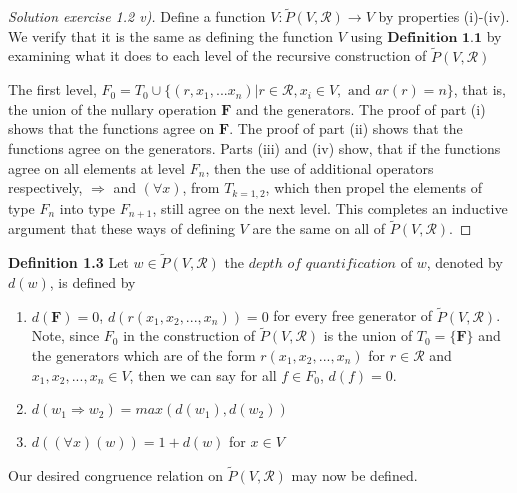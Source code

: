 \documentclass{article}
\theoremstyle{problemstyle}
\begin{document}
\begin{proof}[Solution exercise 1.2 v)] 
Define a function $V:\widetilde{P}(V, \mathscr{R}) \rightarrow V$ by properties (i)-(iv). We verify that it is the same as defining the function $V$ using $\textbf{Definition 1.1}$ by examining what it does to each level of the recursive construction of $\widetilde{P}(V, \mathscr{R})$

The first level, $F_0 = T_0 \cup \{(r,x_1,...x_n)|r \in \mathscr{R}, x_i \in V, \text{ and }ar(r) = n\}$, that is, the union of the nullary operation $\textbf{F}$ and the generators. The proof of part (i) shows that the functions agree on $\textbf{F}$. The proof of part (ii) shows that the functions agree on the generators. Parts (iii) and (iv) show, that if the functions agree on all elements at level $F_n$, then the use of additional operators respectively, $\Rightarrow$ and $(\forall x)$, from $T_{k=1,2}$, which then propel the elements of type $F_n$ into type $F_{n+1}$, still agree on the next level. This completes an inductive argument that these ways of defining $V$ are the same on all of $\widetilde{P}(V, \mathscr{R})$.
\end{proof}

\begin{flushleft}
\textbf{Definition 1.3} Let $w \in \widetilde{P}(V,\mathscr{R})$ the $depth$ $of$ $quantification$ of $w$, denoted by $d(w)$, is defined by 

\begin{enumerate}
\item $d(\textbf{F}) = 0$, $d(r(x_1,x_2,...,x_n)) = 0$ for every free generator of $\widetilde{P}(V,\mathscr{R})$. Note, since $F_0$ in the construction of $\widetilde{P}(V,\mathscr{R})$ is the union of $T_0 = \{\textbf{F}\}$ and the generators which are of the form $r(x_1,x_2,...,x_n)$ for $r \in \mathscr{R}$ and $x_1,x_2,...,x_n \in V$, then we can say for all $f \in F_0$, $d(f) = 0$. 

\item $d(w_1 \Rightarrow w_2) = max(d(w_1),d(w_2))$

\item $d((\forall x)(w)) = 1 + d(w)$ for $x \in V$ 
\end{enumerate}
\end{flushleft}
Our desired congruence relation on $\widetilde{P}(V,\mathscr{R})$ may now be defined. 
\end{document}
